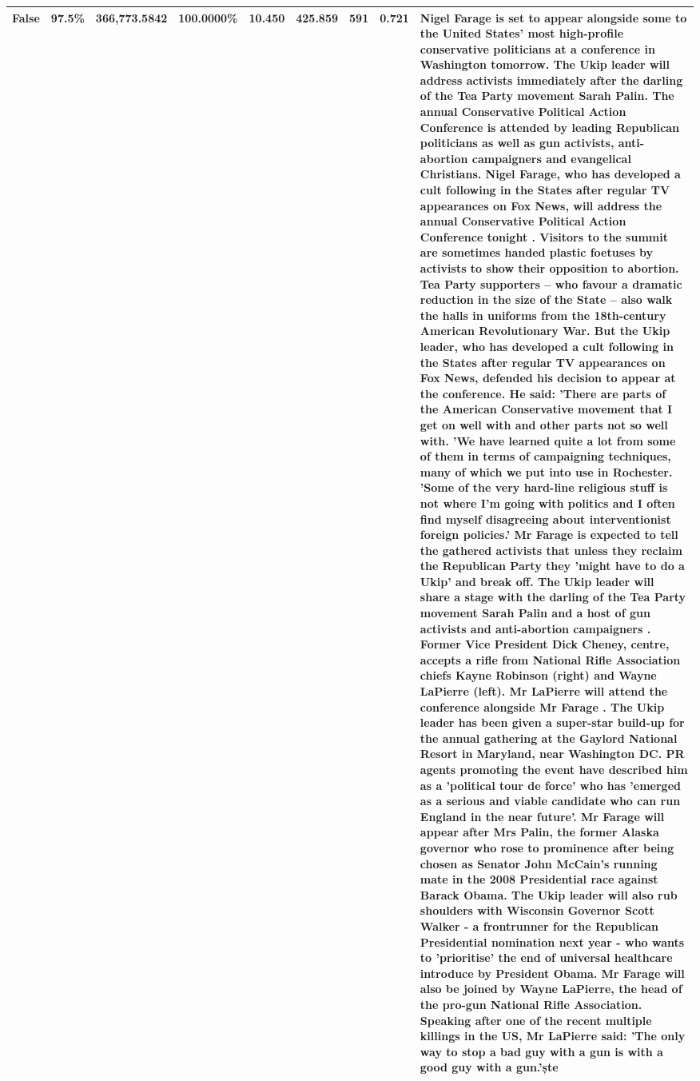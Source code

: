 \begin{table}[H]
\begin{tabular}{lllrlllll}
\cline{1-9}
False & 97.5\% & 366,773.5842 & \bfseries \color{red} 100.0000\% & 10.450 & 425.859 & 591 & 0.721 & Nigel Farage is set to appear alongside some to the United States' most high-profile conservative politicians at a conference in Washington tomorrow. The Ukip leader will address activists immediately after the darling of the Tea Party movement Sarah Palin. The annual Conservative Political Action Conference is attended by leading Republican politicians as well as gun activists, anti-abortion campaigners and evangelical Christians. Nigel Farage, who has developed a cult following in the States after regular TV appearances on Fox News, will address the annual Conservative Political Action Conference tonight . Visitors to the summit are sometimes handed plastic foetuses by activists to show their opposition to abortion. Tea Party supporters – who favour a dramatic reduction in the size of the State – also walk the halls in uniforms from the 18th-century American Revolutionary War. But the Ukip leader, who has developed a cult following in the States after regular TV appearances on Fox News, defended his decision to appear at the conference. He said: 'There are parts of the American Conservative movement that I get on well with and other parts not so well with. 'We have learned quite a lot from some of them in terms of campaigning techniques, many of which we put into use in Rochester. 'Some of the very hard-line religious stuff is not where I'm going with politics and I often find myself disagreeing about interventionist foreign policies.' Mr Farage is expected to tell the gathered activists that unless they reclaim the Republican Party they 'might have to do a Ukip' and break off. The Ukip leader will share a stage with the darling of the Tea Party movement Sarah Palin and a host of gun activists and anti-abortion campaigners . Former Vice President Dick Cheney, centre, accepts a rifle from National Rifle Association chiefs Kayne Robinson (right) and Wayne LaPierre (left). Mr LaPierre will attend the conference alongside Mr Farage . The Ukip leader has been given a super-star build-up for the annual gathering at the Gaylord National Resort in Maryland, near Washington DC. PR agents promoting the event have described him as a 'political tour de force' who has 'emerged as a serious and viable candidate who can run England in the near future'. Mr Farage will appear after Mrs Palin, the former Alaska governor who rose to prominence after being chosen as Senator John McCain's running mate in the 2008 Presidential race against Barack Obama. The Ukip leader will also rub shoulders with Wisconsin Governor Scott Walker - a frontrunner for the Republican Presidential nomination next year - who wants to 'prioritise' the end of universal healthcare introduce by President Obama. Mr Farage will also be joined by Wayne LaPierre, the head of the pro-gun National Rifle Association. Speaking after one of the recent multiple killings in the US, Mr LaPierre said: 'The only way to stop a bad guy with a gun is with a good guy with a gun.'ște \\
\cline{1-9}
\bottomrule
\end{tabular}
\end{table}
